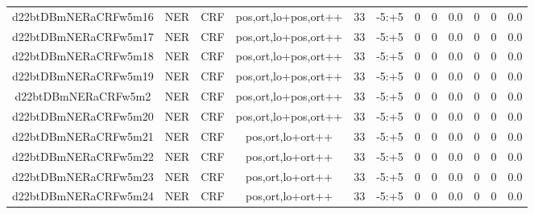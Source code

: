 \documentclass[a4paper]{article}
\begin{document}
\begin{landscape}
\begin{center}
\begin{tabular}{ |c|c|c|c|c|c|c|c|c|c|c|c|}
 
 	
 	\small{ d22btDBmNERaCRFw5m16 } & \small{ NER} & \small{  CRF }  & pos,ort,lo+pos,ort++  &  33 &  \small{  -5:+5 }  &  0 & 0 & 0.0  &  0 & 0 & 0.0 \\
 	

 
 	
 	\small{ d22btDBmNERaCRFw5m17 } & \small{ NER} & \small{  CRF }  & pos,ort,lo+pos,ort++  &  33 &  \small{  -5:+5 }  &  0 & 0 & 0.0  &  0 & 0 & 0.0 \\
 	

 
 	
 	\small{ d22btDBmNERaCRFw5m18 } & \small{ NER} & \small{  CRF }  & pos,ort,lo+pos,ort++  &  33 &  \small{  -5:+5 }  &  0 & 0 & 0.0  &  0 & 0 & 0.0 \\
 	

 
 	
 	\small{ d22btDBmNERaCRFw5m19 } & \small{ NER} & \small{  CRF }  & pos,ort,lo+pos,ort++  &  33 &  \small{  -5:+5 }  &  0 & 0 & 0.0  &  0 & 0 & 0.0 \\
 	

 
 	
 	\small{ d22btDBmNERaCRFw5m2 } & \small{ NER} & \small{  CRF }  & pos,ort,lo+pos,ort++  &  33 &  \small{  -5:+5 }  &  0 & 0 & 0.0  &  0 & 0 & 0.0 \\
 	

 
 	
 	\small{ d22btDBmNERaCRFw5m20 } & \small{ NER} & \small{  CRF }  & pos,ort,lo+pos,ort++  &  33 &  \small{  -5:+5 }  &  0 & 0 & 0.0  &  0 & 0 & 0.0 \\
 	

 
 	
 	\small{ d22btDBmNERaCRFw5m21 } & \small{ NER} & \small{  CRF }  & pos,ort,lo+ort++  &  33 &  \small{  -5:+5 }  &  0 & 0 & 0.0  &  0 & 0 & 0.0 \\
 	

 
 	
 	\small{ d22btDBmNERaCRFw5m22 } & \small{ NER} & \small{  CRF }  & pos,ort,lo+ort++  &  33 &  \small{  -5:+5 }  &  0 & 0 & 0.0  &  0 & 0 & 0.0 \\
 	

 
 	
 	\small{ d22btDBmNERaCRFw5m23 } & \small{ NER} & \small{  CRF }  & pos,ort,lo+ort++  &  33 &  \small{  -5:+5 }  &  0 & 0 & 0.0  &  0 & 0 & 0.0 \\
 	

 
 	
 	\small{ d22btDBmNERaCRFw5m24 } & \small{ NER} & \small{  CRF }  & pos,ort,lo+ort++  &  33 &  \small{  -5:+5 }  &  0 & 0 & 0.0  &  0 & 0 & 0.0 \\
 	


\end{tabular}
\end{center}
\end{landscape}
\end{document}

